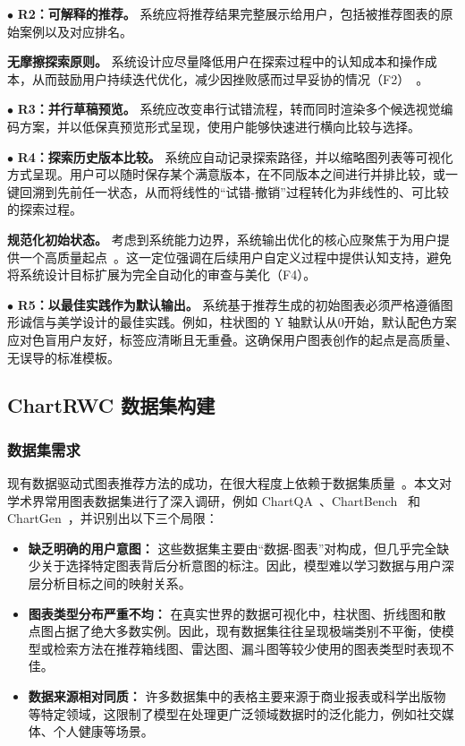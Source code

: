 $\bullet$ \textbf{R2：可解释的推荐。}
系统应将推荐结果完整展示给用户，包括被推荐图表的原始案例以及对应排名。

\noindent\textbf{无摩擦探索原则。}
系统设计应尽量降低用户在探索过程中的认知成本和操作成本，从而鼓励用户持续迭代优化，减少因挫败感而过早妥协的情况（F2）~\cite{luo2021natural}。

$\bullet$ \textbf{R3：并行草稿预览。}
系统应改变串行试错流程，转而同时渲染多个候选视觉编码方案，并以低保真预览形式呈现，使用户能够快速进行横向比较与选择。

$\bullet$ \textbf{R4：探索历史版本比较。}
系统应自动记录探索路径，并以缩略图列表等可视化方式呈现。用户可以随时保存某个满意版本，在不同版本之间进行并排比较，或一键回溯到先前任一状态，从而将线性的“试错-撤销”过程转化为非线性的、可比较的探索过程。

\noindent\textbf{规范化初始状态。}
考虑到系统能力边界，系统输出优化的核心应聚焦于为用户提供一个高质量起点~\cite{stokes2022striking}。这一定位强调在后续用户自定义过程中提供认知支持，避免将系统设计目标扩展为完全自动化的审查与美化（F4）。

$\bullet$ \textbf{R5：以最佳实践作为默认输出。}
系统基于推荐生成的初始图表必须严格遵循图形诚信与美学设计的最佳实践。例如，柱状图的 Y 轴默认从0开始，默认配色方案应对色盲用户友好，标签应清晰且无重叠。这确保用户图表创作的起点是高质量、无误导的标准模板。


\subsection{ChartRWC 数据集构建}

\subsubsection{数据集需求}

现有数据驱动式图表推荐方法的成功，在很大程度上依赖于数据集质量~\cite{dibia2019data2vis,hu2019vizml}。本文对学术界常用图表数据集进行了深入调研，例如 ChartQA~\cite{masry2022chartqa}、ChartBench~\cite{Xu2023ChartBench} 和 ChartGen~\cite{kondic2025chartgen}，并识别出以下三个局限：

\begin{itemize}
    \item \textbf{缺乏明确的用户意图：} 这些数据集主要由“数据-图表”对构成，但几乎完全缺少关于选择特定图表背后分析意图的标注。因此，模型难以学习数据与用户深层分析目标之间的映射关系。
    \item \textbf{图表类型分布严重不均：} 在真实世界的数据可视化中，柱状图、折线图和散点图占据了绝大多数实例。因此，现有数据集往往呈现极端类别不平衡，使模型或检索方法在推荐箱线图、雷达图、漏斗图等较少使用的图表类型时表现不佳。
    \item \textbf{数据来源相对同质：} 许多数据集中的表格主要来源于商业报表或科学出版物等特定领域，这限制了模型在处理更广泛领域数据时的泛化能力，例如社交媒体、个人健康等场景。
\end{itemize}

